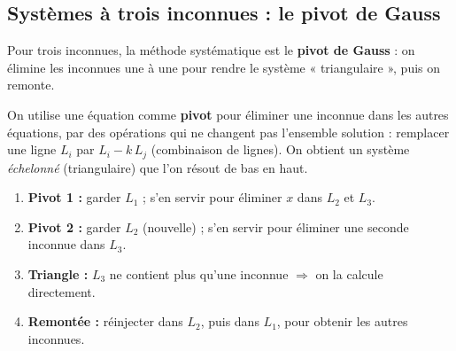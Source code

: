 \documentclass[11pt,a4paper]{article}
\begin{document}
\subsection{Systèmes à trois inconnues : le pivot de Gauss}

Pour trois inconnues, la méthode systématique est le \textbf{pivot de Gauss} : on élimine les inconnues
une à une pour rendre le système « triangulaire », puis on remonte.

\begin{definition}
On utilise une équation comme \textbf{pivot} pour éliminer une inconnue dans les autres équations, par
des opérations qui ne changent pas l'ensemble solution : remplacer une ligne $L_i$ par $L_i-k\,L_j$
(combinaison de lignes). On obtient un système \emph{échelonné} (triangulaire) que l'on résout de bas
en haut.
\end{definition}

\begin{commentfaire}
\begin{enumerate}[leftmargin=2em,topsep=2pt,itemsep=2pt]
  \item \textbf{Pivot 1 :} garder $L_1$ ; s'en servir pour éliminer $x$ dans $L_2$ et $L_3$.
  \item \textbf{Pivot 2 :} garder $L_2$ (nouvelle) ; s'en servir pour éliminer une seconde inconnue dans $L_3$.
  \item \textbf{Triangle :} $L_3$ ne contient plus qu'une inconnue $\Rightarrow$ on la calcule directement.
  \item \textbf{Remontée :} réinjecter dans $L_2$, puis dans $L_1$, pour obtenir les autres inconnues.
\end{enumerate}
\end{commentfaire}
\end{document}
